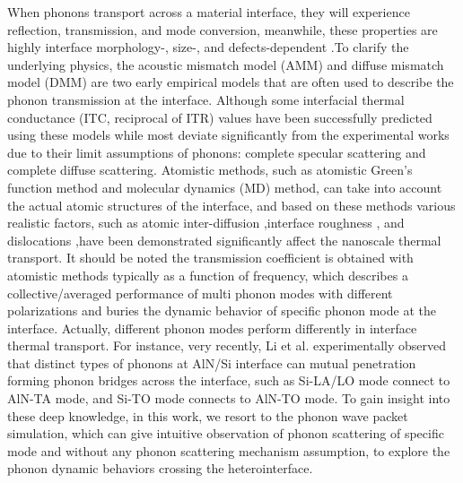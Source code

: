 \documentclass{article}
\begin{document}
       When phonons transport across a material interface, they will experience reflection, transmission, and mode conversion, meanwhile, these properties are highly interface morphology-, size-, and defects-dependent  \cite{li2012size} \cite{li2012effect}.To  clarify the underlying physics, the acoustic mismatch model (AMM) and diffuse mismatch model (DMM) are two early empirical models that are often used to describe the phonon transmission at the interface. Although some interfacial thermal conductance (ITC, reciprocal of ITR) values have been successfully predicted using these models while most deviate significantly from the experimental works due to their limit assumptions of phonons: complete specular scattering and complete diffuse scattering. Atomistic methods, such as atomistic Green’s function method and molecular dynamics (MD) method, can take into account the actual atomic structures of the interface, and based on these methods various realistic factors, such as atomic inter-diffusion  \cite{liu2023impact},interface roughness   \cite{zhou2013relationship} \cite{wang2023atomic}, and dislocations  \cite{li2020gan},have been demonstrated significantly affect the nanoscale thermal transport.  It should be noted the transmission coefficient is obtained with atomistic methods typically as a function of frequency, which describes a collective/averaged performance of multi phonon modes with different polarizations and buries the dynamic behavior of specific phonon mode at the interface. Actually, different phonon modes perform differently in interface thermal transport. For instance, very recently, Li et al.  \cite{li2022atomic} experimentally observed that distinct types of phonons at AlN/Si interface can mutual penetration forming phonon bridges across the interface, such as Si-LA/LO mode connect to AlN-TA mode, and Si-TO mode connects to AlN-TO mode. To gain insight into these deep knowledge, in this work, we resort to the phonon wave packet simulation, which can give intuitive observation of phonon scattering of specific mode and without any phonon scattering mechanism assumption, to explore the phonon dynamic behaviors crossing the heterointerface.
\end{document}
